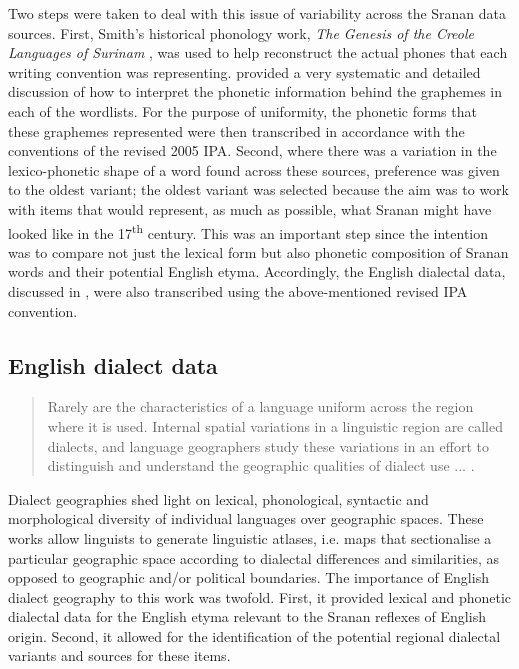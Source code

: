 Two steps were taken to deal with this issue of variability across the Sranan data sources. First, Smith's  historical phonology work, \emph{The Genesis of the Creole Languages of Surinam} \citep{Smith87}, was used to help reconstruct the actual phones that each writing convention was representing. \citet{Smith87} provided a very systematic and detailed discussion of how to interpret the phonetic information behind the graphemes in each of the wordlists. For the purpose of uniformity, the phonetic forms that these graphemes represented were then transcribed in accordance with the conventions of the revised 2005 IPA. Second, where there was a variation in the lexico-phonetic shape of a word found across these sources, preference was given to the oldest variant; the oldest variant was selected because the aim was to work with items that would represent, as much as possible, what Sranan might have looked like in the 17\textsuperscript{th} century. This was an important step since the intention was to compare not just the lexical form but also phonetic composition of Sranan words and their potential English etyma. Accordingly, the English dialectal data, discussed in , were also transcribed using the above-mentioned revised IPA convention.

\subsection{English dialect data} \label{3.2.2}
\begin{quote}
Rarely are the characteristics of a language uniform across the region where it is used. Internal spatial variations in a linguistic region are called dialects, and language geographers study these variations in an effort to distinguish and understand the geographic qualities of dialect use ... \citep[209]{Hanks11}.
\end{quote}

Dialect geographies shed light on lexical, phonological, syntactic and morphological diversity of individual languages over geographic spaces. These works allow linguists to generate linguistic atlases, i.e. maps that sectionalise a particular geographic space according to dialectal differences and similarities, as opposed to geographic and/or political boundaries. The importance of English dialect geography to this work was twofold. First, it provided lexical and phonetic dialectal data for the English etyma relevant to the Sranan reflexes of English origin. Second, it allowed for the identification of the potential regional dialectal variants and sources for these items.

